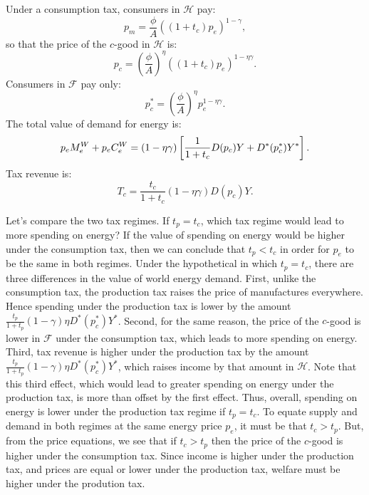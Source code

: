 \documentclass[notitlepage,12pt]{article}
\begin{document}
Under a consumption tax, consumers in $\mathcal{H}$ pay:%
\begin{equation*}
p_{m}=\frac{\phi }{A}\left( \left( 1+t_{c}\right) p_{e}\right) ^{1-\gamma },
\end{equation*}%
so that the price of the $c$-good in $\mathcal{H}$ is:%
\begin{equation*}
p_{c}=\left( \frac{\phi }{A}\right) ^{\eta }\left( \left( 1+t_{c}\right)
p_{e}\right) ^{1-\eta \gamma }.
\end{equation*}%
Consumers in $\mathcal{F}$ pay only:%
\begin{equation*}
p_{c}^{\ast }=\left( \frac{\phi }{A}\right) ^{\eta }p_{e}^{1-\eta \gamma }.
\end{equation*}%
The total value of demand for energy is:%
\begin{equation*}
p_{e}M_{e}^{W}+p_{e}C_{e}^{W}=\left( 1-\eta \gamma \right) \left[ \frac{1}{%
1+t_{c}}D(p_{c})Y+D^{\ast }(p_{c}^{\ast })Y^{\ast }\right] .
\end{equation*}%
Tax revenue is:%
\begin{equation*}
T_{c}=\frac{t_{c}}{1+t_{c}}\left( 1-\eta \gamma \right) D(p_{c})Y.
\end{equation*}

Let's compare the two tax regimes. If $t_{p}=t_{c}$, which tax regime would
lead to more spending on energy? If the value of spending on energy would be
higher under the consumption tax, then we can conclude that $t_{p}<t_{c}$ in
order for $p_{e}$ to be the same in both regimes. Under the hypothetical in
which $t_{p}=t_{c}$, there are three differences in the value of world
energy demand. First, unlike the consumption tax, the production tax raises
the price of manufactures everywhere. Hence spending under the production
tax is lower by the amount $\frac{t_{p}}{1+t_{p}}\left( 1-\gamma \right)
\eta D^{\ast }(p_{c}^{\ast })Y^{\ast }$. Second, for the same reason, the
price of the $c$-good is lower in $\mathcal{F}$ under the consumption tax,
which leads to more spending on energy. Third, tax revenue is higher under
the production tax by the amount $\frac{t_{p}}{1+t_{p}}\left( 1-\gamma
\right) \eta D^{\ast }(p_{c}^{\ast })Y^{\ast }$, which raises income by that
amount in $\mathcal{H}$. Note that this third effect, which would lead to
greater spending on energy under the production tax, is more than offset by
the first effect. Thus, overall, spending on energy is lower under the
production tax regime if $t_{p}=t_{c}$. To equate supply and demand in both
regimes at the same energy price $p_{e}$, it must be that $t_{c}>t_{p}$.
But, from the price equations, we see that if $t_{c}>t_{p}$ then the price
of the $c$-good is higher under the consumption tax. Since income is higher
under the production tax, and prices are equal or lower under the production
tax, welfare must be higher under the prodution tax.
\end{document}
